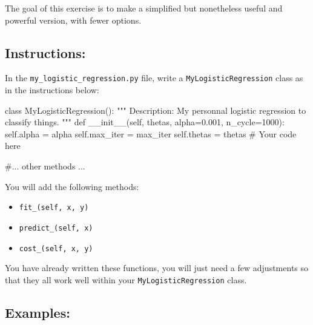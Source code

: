 \documentclass[]{article}
\newenvironment{Shaded}{\begin{snugshade}}{\end{snugshade}}
\newcommand{\CommentTok}[1]{\textcolor[rgb]{0.48,0.49,0.49}{#1}}
\newcommand{\DecValTok}[1]{\textcolor[rgb]{0.96,0.45,0.00}{#1}}
\newcommand{\FloatTok}[1]{\textcolor[rgb]{0.96,0.45,0.00}{#1}}
\newcommand{\FunctionTok}[1]{\textcolor[rgb]{0.56,0.27,0.68}{#1}}
\newcommand{\KeywordTok}[1]{\textcolor[rgb]{0.81,0.81,0.76}{#1}}
\newcommand{\NormalTok}[1]{\textcolor[rgb]{0.81,0.81,0.76}{#1}}
\newcommand{\OperatorTok}[1]{\textcolor[rgb]{0.81,0.81,0.76}{#1}}
\newcommand{\VariableTok}[1]{\textcolor[rgb]{0.15,0.68,0.68}{#1}}
\begin{document}
The goal of this exercise is to make a simplified but nonetheless useful
and powerful version, with fewer options.

\hypertarget{instructions}{%
\subsection{Instructions:}\label{instructions}}

In the \texttt{my\_logistic\_regression.py} file, write a
\texttt{MyLogisticRegression} class as in the instructions below:

\begin{Shaded}
\begin{Highlighting}[]
\KeywordTok{class}\NormalTok{ MyLogisticRegression():}
    \CommentTok{"""}
\CommentTok{    Description:}
\CommentTok{        My personnal logistic regression to classify things.}
\CommentTok{    """}
    \KeywordTok{def} \FunctionTok{__init__}\NormalTok{(}\VariableTok{self}\NormalTok{, thetas, alpha}\OperatorTok{=}\FloatTok{0.001}\NormalTok{, n_cycle}\OperatorTok{=}\DecValTok{1000}\NormalTok{):}
        \VariableTok{self}\NormalTok{.alpha }\OperatorTok{=}\NormalTok{ alpha}
        \VariableTok{self}\NormalTok{.max_iter }\OperatorTok{=}\NormalTok{ max_iter}
        \VariableTok{self}\NormalTok{.thetas }\OperatorTok{=}\NormalTok{ thetas}
        \CommentTok{# Your code here}

    \CommentTok{#... other methods ...}
\end{Highlighting}
\end{Shaded}

You will add the following methods:

\begin{itemize}
\item
  \texttt{fit\_(self,\ x,\ y)}
\item
  \texttt{predict\_(self,\ x)}
\item
  \texttt{cost\_(self,\ x,\ y)}
\end{itemize}

You have already written these functions, you will just need a few
adjustments so that they all work well within your
\texttt{MyLogisticRegression} class.

\hypertarget{examples}{%
\subsection{Examples:}\label{examples}}
\end{document}
